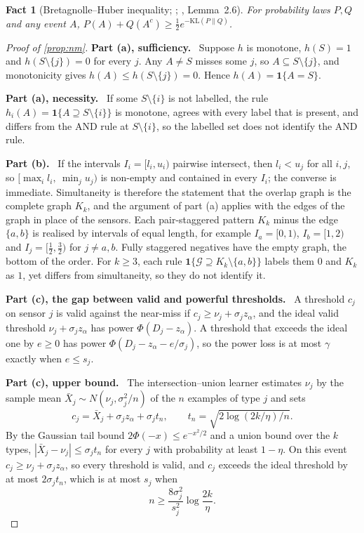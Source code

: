 \documentclass[11pt]{article}
\numberwithin{equation}{section}
\theoremstyle{plain}
\newtheorem{fact}{Fact}
\newcommand{\one}{\mathbf{1}}
\newcommand{\step}[1]{\par\medskip\noindent\textbf{#1}\ }
\begin{document}
\begin{fact}[Bretagnolle--Huber inequality; \citealp{bretagnolle1979}; \citealp{tsybakov2009}, Lemma~2.6]\label{fact:bh}
For probability laws $P,Q$ and any event $A$, $P(A)+Q(A^c)\ge\frac12e^{-\mathrm{KL}(P\|Q)}$.
\end{fact}

\begin{proof}[Proof of \cref{prop:nm}]
\step{Part (a), sufficiency.} Suppose $h$ is monotone, $h(S)=1$ and $h(S\setminus\{j\})=0$ for every $j$. Any $A\ne S$ misses some $j$, so $A\subseteq S\setminus\{j\}$, and monotonicity gives $h(A)\le h(S\setminus\{j\})=0$. Hence $h(A)=\one\{A=S\}$.

\step{Part (a), necessity.} If some $S\setminus\{i\}$ is not labelled, the rule $h_i(A)=\one\{A\supseteq S\setminus\{i\}\}$ is monotone, agrees with every label that is present, and differs from the AND rule at $S\setminus\{i\}$, so the labelled set does not identify the AND rule.

\step{Part (b).} If the intervals $I_i=[l_i,u_i)$ pairwise intersect, then $l_i<u_j$ for all $i,j$, so $[\max_il_i,\ \min_ju_j)$ is non-empty and contained in every $I_i$; the converse is immediate. Simultaneity is therefore the statement that the overlap graph is the complete graph $K_k$, and the argument of part (a) applies with the edges of the graph in place of the sensors. Each pair-staggered pattern $K_k$ minus the edge $\{a,b\}$ is realised by intervals of equal length, for example $I_a=[0,1)$, $I_b=[1,2)$ and $I_j=[\frac12,\frac32)$ for $j\ne a,b$. Fully staggered negatives have the empty graph, the bottom of the order. For $k\ge3$, each rule $\one\{\mathcal G\supseteq K_k\setminus\{a,b\}\}$ labels them $0$ and $K_k$ as $1$, yet differs from simultaneity, so they do not identify it.

\step{Part (c), the gap between valid and powerful thresholds.} A threshold $c_j$ on sensor $j$ is valid against the near-miss if $c_j\ge\nu_j+\sigma_jz_\alpha$, and the ideal valid threshold $\nu_j+\sigma_jz_\alpha$ has power $\Phi(D_j-z_\alpha)$. A threshold that exceeds the ideal one by $e\ge0$ has power $\Phi(D_j-z_\alpha-e/\sigma_j)$, so the power loss is at most $\gamma$ exactly when $e\le s_j$.

\step{Part (c), upper bound.} The intersection--union learner estimates $\nu_j$ by the sample mean $\bar X_j\sim N(\nu_j,\sigma_j^2/n)$ of the $n$ examples of type $j$ and sets
\begin{equation}\label{eq:learner}
  c_j=\bar X_j+\sigma_jz_\alpha+\sigma_jt_n,
  \qquad
  t_n=\sqrt{2\log(2k/\eta)/n}.
\end{equation}
By the Gaussian tail bound $2\Phi(-x)\le e^{-x^2/2}$ and a union bound over the $k$ types, $|\bar X_j-\nu_j|\le\sigma_jt_n$ for every $j$ with probability at least $1-\eta$. On this event $c_j\ge\nu_j+\sigma_jz_\alpha$, so every threshold is valid, and $c_j$ exceeds the ideal threshold by at most $2\sigma_jt_n$, which is at most $s_j$ when
\begin{equation}\label{eq:upper}
  \boxed{\;n\ge\frac{8\sigma_j^2}{s_j^2}\log\frac{2k}{\eta}.\;}
\end{equation}


\end{proof}
\end{document}

